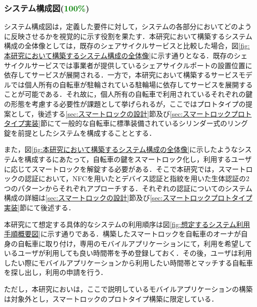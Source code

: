      \subsubsection{システム構成図(\textcolor{green}{100\%})}
        \label{sec:システム構成図}
          \par システム構成図は，定義した要件に対して，システムの各部分においてどのように反映させるかを視覚的に示す役割を果たす．本研究において構築するシステム構成の全体像としては，既存のシェアサイクルサービスと比較した場合，図\ref{fig:本研究において構築するシステム構成の全体像}に示す通りとなる．既存のシェサイクルサービスでは事業者が提供しているシェアサイクルポートの設置位置に依存してサービスが展開される．一方で，本研究において構築するサービスモデルでは個人所有の自転車が駐輪されている駐輪場に依存してサービスを展開することが可能である．それ故に，個人所有の自転車で利用されているそれぞれの鍵の形態を考慮する必要性が課題として挙げられるが，ここではプロトタイプの提案として，後述する\ref{sec:スマートロックの設計}節及び\ref{sec:スマートロックプロトタイプ実装}節にて一般的な自転車に標準装備されているシリンダー式のリング錠を前提としたシステムを構成することとする．
           \par また，図\ref{fig:本研究において構築するシステム構成の全体像}に示したようなシステムを構成するにあたって，自転車の鍵をスマートロック化し，利用するユーザに応じてスマートロックを解錠する必要がある．そこで本研究では，スマートロックの認証において，NFCを用いたとデバイス認証と指紋を用いた生体認証の2つのパターンからそれぞれアプローチする．それぞれの認証についてのシステム構成の詳細は\ref{sec:スマートロックの設計}節及び\ref{sec:スマートロックプロトタイプ実装}節にて後述する．
           \par 本研究にて想定する具体的なシステムの利用順序は図\ref{fig:想定するシステム利用手順概要図}に示す通りである．構築したスマートロックを自転車のオーナが自身の自転車に取り付け，専用のモバイルアプリケーションにて，利用を希望しているユーザが利用しても良い時間帯を予め登録しておく．その後，ユーザは利用したい際にモバイルアプリケーションから利用したい時間帯とマッチする自転車を探し出し，利用の申請を行う．
           \par ただし，本研究においは，ここで説明しているモバイルアプリケーションの構築は対象外とし，スマートロックのプロトタイプ構築に限定している．
          
